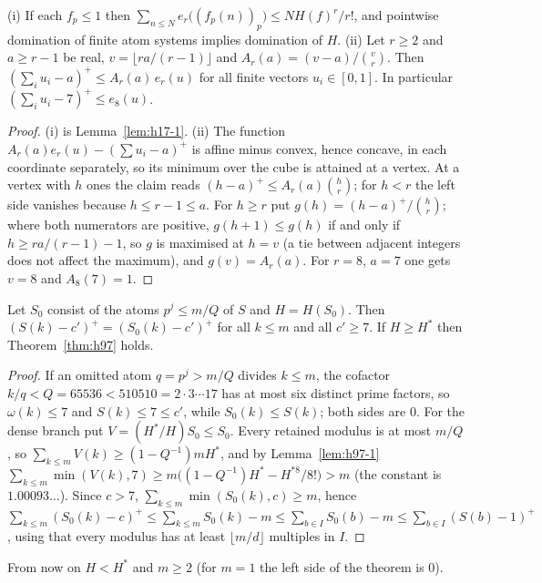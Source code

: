 \begin{lemma}\label{lem:h97-1}
(i) If each $f_p\le1$ then $\sum_{n\le N}e_r\bigl((f_p(n))_p\bigr)\le NH(f)^r/r!$, and pointwise domination of finite
atom systems implies domination of $H$. (ii) Let $r\ge2$ and $a\ge r-1$ be real, $v=\lfloor ra/(r-1)\rfloor$ and
$A_r(a)=(v-a)/\binom vr$. Then $(\sum_iu_i-a)^+\le A_r(a)\,e_r(u)$ for all finite vectors $u_i\in[0,1]$. In particular
$(\sum_iu_i-7)^+\le e_8(u)$.
\end{lemma}
\begin{proof}
(i) is Lemma~\ref{lem:h17-1}. (ii) The function $A_r(a)e_r(u)-(\sum u_i-a)^+$ is affine minus convex, hence concave,
in each coordinate separately, so its minimum over the cube is attained at a vertex. At a vertex with $h$ ones the
claim reads $(h-a)^+\le A_r(a)\binom hr$; for $h<r$ the left side vanishes because $h\le r-1\le a$. For $h\ge r$ put
$g(h)=(h-a)^+/\binom hr$; where both numerators are positive, $g(h+1)\le g(h)$ if and only if $h\ge ra/(r-1)-1$, so
$g$ is maximised at $h=v$ (a tie between adjacent integers does not affect the maximum), and $g(v)=A_r(a)$. For
$r=8$, $a=7$ one gets $v=8$ and $A_8(7)=1$.
\end{proof}

\begin{lemma}\label{lem:h97-2}
Let $S_0$ consist of the atoms $p^j\le m/Q$ of $S$ and $H=H(S_0)$. Then $(S(k)-c')^+=(S_0(k)-c')^+$ for all $k\le m$
and all $c'\ge7$. If $H\ge H^*$ then Theorem~\ref{thm:h97} holds.
\end{lemma}
\begin{proof}
If an omitted atom $q=p^j>m/Q$ divides $k\le m$, the cofactor $k/q<Q=65536<510510=2\cdot3\cdots17$ has at most six
distinct prime factors, so $\omega(k)\le7$ and $S(k)\le7\le c'$, while $S_0(k)\le S(k)$; both sides are $0$. For the
dense branch put $V=(H^*/H)S_0\le S_0$. Every retained modulus is at most $m/Q$, so
$\sum_{k\le m}V(k)\ge(1-Q^{-1})mH^*$, and by Lemma~\ref{lem:h97-1}
$\sum_{k\le m}\min(V(k),7)\ge m\bigl((1-Q^{-1})H^*-H^{*8}/8!\bigr)>m$ (the constant is $1.00093\ldots$). Since
$c>7$, $\sum_{k\le m}\min(S_0(k),c)\ge m$, hence
$\sum_{k\le m}(S_0(k)-c)^+\le\sum_{k\le m}S_0(k)-m\le\sum_{b\in I}S_0(b)-m\le\sum_{b\in I}(S(b)-1)^+$,
using that every modulus has at least $\lfloor m/d\rfloor$ multiples in $I$.
\end{proof}

From now on $H<H^*$ and $m\ge2$ (for $m=1$ the left side of the theorem is $0$).

